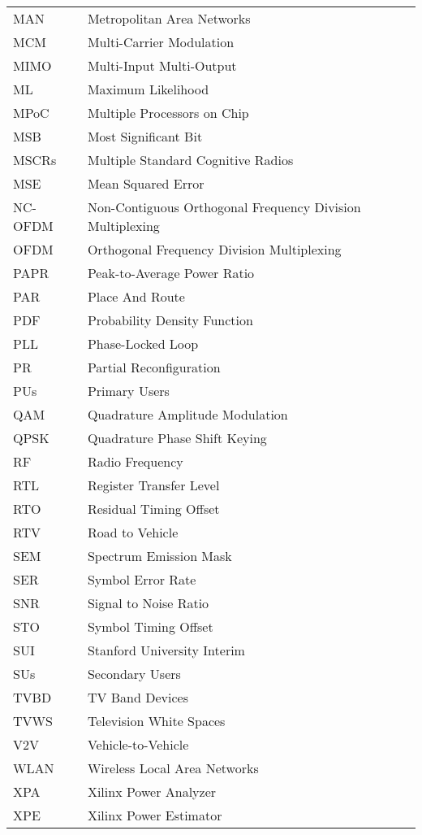 \newpage %
\begin{tabular}{p{100pt}l}
MAN & Metropolitan Area Networks   \\
MCM & Multi-Carrier Modulation   \\
MIMO & Multi-Input Multi-Output   \\
ML & Maximum Likelihood   \\
MPoC & Multiple Processors on Chip   \\
MSB& Most Significant Bit   \\
MSCRs & Multiple Standard Cognitive Radios   \\
MSE & Mean Squared Error   \\
NC-OFDM & Non-Contiguous Orthogonal Frequency Division Multiplexing   \\
OFDM & Orthogonal Frequency Division Multiplexing   \\
PAPR & Peak-to-Average Power Ratio   \\
PAR & Place And Route   \\
PDF & Probability Density Function   \\
PLL & Phase-Locked Loop   \\
PR & Partial Reconfiguration   \\
PUs & Primary Users   \\
QAM & Quadrature Amplitude Modulation   \\
QPSK & Quadrature Phase Shift Keying   \\
RF & Radio Frequency   \\
RTL & Register Transfer Level   \\
RTO & Residual Timing Offset   \\
RTV & Road to Vehicle   \\
SEM & Spectrum Emission Mask   \\
SER & Symbol Error Rate   \\
SNR & Signal to Noise Ratio   \\
STO & Symbol Timing Offset   \\
SUI & Stanford University Interim   \\
SUs & Secondary Users   \\
TVBD & TV Band Devices   \\
TVWS & Television White Spaces   \\
V2V & Vehicle-to-Vehicle   \\
WLAN & Wireless Local Area Networks   \\
XPA & Xilinx Power Analyzer   \\
XPE & Xilinx Power Estimator   \\
\end{tabular}
